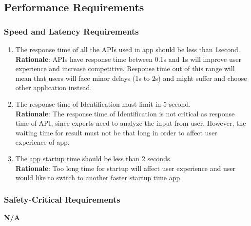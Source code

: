 
\subsection{Performance Requirements}
\label{sub:performance_requirements}

\subsubsection{Speed and Latency Requirements}
\label{ssub:speed_and_latency_requirements}
\begin{enumerate}[{PR-SL}1. ]
	\item The response time of all the APIs used in app should be less than 1second.\\ \textbf{Rationale}: APIs have response time between 0.1s and 1s will improve user experience and increase competitive. 	Response time out of this range will mean that users will face minor delays (1s to 2s) and might suffer and choose 	other application instead.
	\item The response time of Identification must limit in 5 second.\\ \textbf{Rationale}: The response time of Identification is not critical as response time of API, since experts need to analyze the 	input from user. However, the waiting time for result must not be that long in order to affect user experience of app.
	\item The app startup time should be less than 2 seconds.\\ \textbf{Rationale}: Too long time for startup will affect user experience and user would like to switch to another faster startup time app.
\end{enumerate}


\subsubsection{Safety-Critical Requirements}
\label{ssub:safety_critical_requirements}
	\textbf{N/A}

